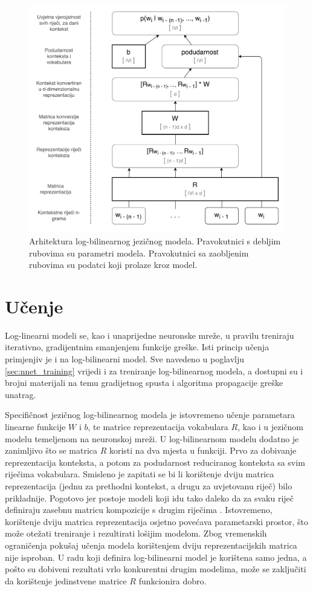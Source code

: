 \documentclass[times, utf8, diplomski, numeric]{fer}
\begin{document}
\begin{figure}[!htb]
\centering
\includegraphics[scale=0.5]{fig/lbl.pdf}
\caption{Arhitektura log-bilinearnog jezičnog modela. Pravokutnici s debljim rubovima su parametri modela. Pravokutnici sa zaobljenim rubovima su podatci koji prolaze kroz model.}
\label{fig:lbl}
\end{figure}

\section{Učenje}

Log-linearni modeli se, kao i unaprijedne neuronske mreže, u pravilu treniraju iterativno, gradijentnim smanjenjem funkcije greške. Isti princip učenja primjenjiv je i na log-bilinearni model. Sve navedeno u poglavlju \ref{sec:nnet_training} vrijedi i za treniranje log-bilinearnog modela, a dostupni su i brojni materijali na temu gradijetnog spusta i algoritma propagacije greške unatrag.

Specifičnost jezičnog log-bilinearnog modela je istovremeno učenje parametara linearne funkcije $W$ i $b$, te matrice reprezentacija vokabulara $R$, kao i u jezičnom modelu temeljenom na neuronskoj mreži. U log-bilinearnom modelu dodatno je zanimljivo što se matrica $R$ koristi na dva mjesta u funkciji. Prvo za dobivanje reprezentacija konteksta, a potom za podudarnost reduciranog konteksta sa svim riječima vokabulara. Smisleno je zapitati se bi li korištenje dviju matrica reprezentacija (jednu za prethodni kontekst, a drugu za uvjetovanu riječ) bilo prikladnije. Pogotovo jer postoje modeli koji idu tako daleko da za svaku riječ definiraju zasebnu matricu kompozicije s drugim riječima \cite{SocherEtAl2012:MVRNN}. Istovremeno, korištenje dviju matrica reprezentacija osjetno povećava parametarski prostor, što može otežati treniranje i rezultirati lošijim modelom. Zbog vremenskih ograničenja pokušaj učenja modela korištenjem dviju reprezentacijskih matrica nije isproban. U radu koji definira log-bilinearni model \cite{MnihH07} je korištena samo jedna, a pošto su dobiveni rezultati vrlo konkurentni drugim modelima, može se zaključiti da korištenje jedinstvene matrice $R$ funkcionira dobro.
\end{document}

